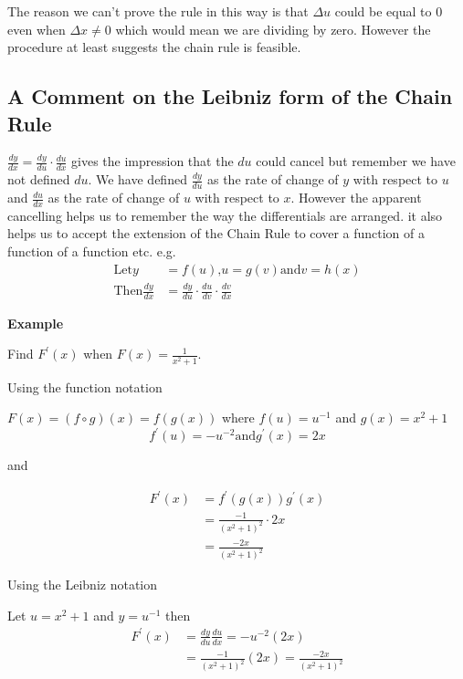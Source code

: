 The reason we can't prove the rule in this way is that $ \Delta u$ could be equal to $0$ even when $ \Delta x \neq 0$ which would mean we are dividing by zero. However the procedure at least suggests
the chain rule is feasible. 

\subsection{A Comment on the Leibniz form of the Chain Rule}
$\frac{d y}{d x} =\frac{d y}{d u} \cdot \frac{d u}{d x}$ gives the impression that the $d u$ could cancel but remember we have not defined $d u$. We have defined $\frac{d y}{d u}$ as the rate of change of $y$ with respect to $u$ and $\frac{d u}{d x}$ as the rate of change of $u$ with respect to $x$. However the apparent cancelling helps us to remember the way the differentials
are arranged. it also helps us to accept the extension of the Chain Rule to cover a function of a function of
a function etc. e.g.
\begin{align*}\text{Let}y &  = f (u)\text{,}u =g (v)\text{and}v =h (x) \\
\text{Then}\frac{d y}{d x} &  = \frac{d y}{d u} \cdot \frac{d u}{d v} \cdot \frac{d v}{d x}\end{align*}

\textbf{Example} 

Find $F^{ \prime } (x)$ when $F (x) =\frac{1}{x^{2} +1}$. 

Using the function notation 

$F (x) =\left (f \circ g\right ) (x) =f (g (x))$ where $f (u) =u^{ -1}$ and $g (x) =x^{2} +1$
\begin{equation*}f^{ \prime } (u) = -u^{ -2}\text{and}g^{ \prime } (x) =2 x
\end{equation*}

and 


\begin{align*}F^{ \prime } (x) &  = f^{ \prime } (g (x)) g^{ \prime } (x) \\
 &  = \frac{ -1}{(x^{2} +1)^{2}} \cdot 2 x \\
 &  = \frac{ -2 x}{\left (x^{2} +1\right )^{2}}\end{align*}

Using the Leibniz notation 

Let $u =x^{2} +1$ and $y =u^{ -1}$ then
\begin{align*}F^{ \prime } (x) &  = \frac{d y}{d u} \frac{d u}{d x} = -u^{ -2} \left (2 x\right ) \\
 &  = \frac{ -1}{\left (x^{2} +1\right )^{2}} \left (2 x\right ) =\frac{ -2 x}{\left (x^{2} +1\right )^{2}}\end{align*}

